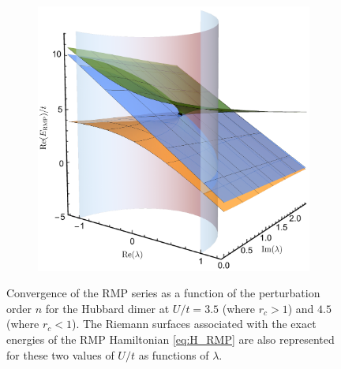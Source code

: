 \documentclass[aps,prb,reprint,noshowkeys,linenumbers,superscriptaddress]{revtex4-1}
\begin{document}
\begin{figure}
\begin{subfigure}{0.32\textwidth}
	\includegraphics[height=0.75\textwidth]{fig2c}	
    \end{subfigure}
	\caption{
	Convergence of the RMP series as a function of the perturbation order $n$ for the Hubbard dimer at $U/t = 3.5$ (where $r_c > 1$) and $4.5$ (where $r_c < 1$).
	The Riemann surfaces associated with the exact energies of the RMP Hamiltonian \eqref{eq:H_RMP} are also represented for these two values of $U/t$ as functions of $\lambda$. 
	\label{fig:RMP}}
\end{figure}
\end{document}
